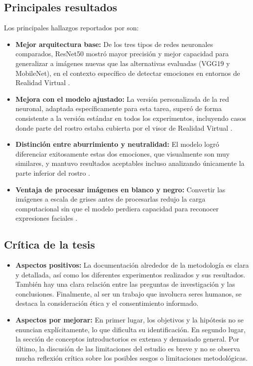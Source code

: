 \subsection{Principales resultados}

Los principales hallazgos reportados por \cite{shomoye2024} son:

\begin{itemize}
    \item \textbf{Mejor arquitectura base:} De los tres tipos de redes neuronales comparados, ResNet50 mostró mayor precisión y mejor capacidad para generalizar a imágenes nuevas que las alternativas evaluadas (VGG19 y MobileNet), en el contexto específico de detectar emociones en entornos de Realidad Virtual \cite{shomoye2024}.
    \item \textbf{Mejora con el modelo ajustado:} La versión personalizada de la red neuronal, adaptada específicamente para esta tarea, superó de forma consistente a la versión estándar en todos los experimentos, incluyendo casos donde parte del rostro estaba cubierta por el visor de Realidad Virtual \cite{shomoye2024}.
    \item \textbf{Distinción entre aburrimiento y neutralidad:} El modelo logró diferenciar exitosamente estas dos emociones, que visualmente son muy similares, y mantuvo resultados aceptables incluso analizando únicamente la parte inferior del rostro \cite{shomoye2024}.
    \item \textbf{Ventaja de procesar imágenes en blanco y negro:} Convertir las imágenes a escala de grises antes de procesarlas redujo la carga computacional sin que el modelo perdiera capacidad para reconocer expresiones faciales \cite{shomoye2024}.
\end{itemize}

\subsection{Crítica de la tesis}
\begin{itemize}
    \item \textbf{Aspectos positivos:} La documentación alrededor de la metodología es clara y detallada, así como los diferentes experimentos realizados y sus resultados. También hay una clara relación entre las preguntas de investigación y las conclusiones. Finalmente, al ser un trabajo que involucra seres humanos, se destaca la consideración ética y el consentimiento informado. 
    \item \textbf{Aspectos por mejorar:} En primer lugar, los objetivos y la hipótesis no se enuncian explícitamente, lo que dificulta su identificación. En segundo lugar, la sección de conceptos introductorios es extensa y demasiado general. Por último, la discusión de las limitaciones del estudio es breve y no se observa mucha reflexión crítica sobre los posibles sesgos o limitaciones metodológicas.
\end{itemize}
 

